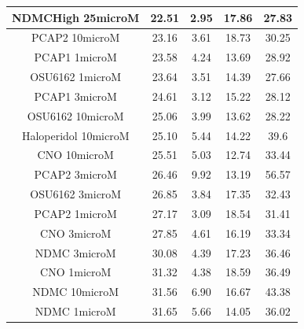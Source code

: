 \documentclass[a4paper,12pt]{article}
\begin{document}
\begin{table}[h!]
\begin{tabular}{|c|c|c|c|c|}
NDMCHigh 25microM     & 22.51 & 2.95 & 17.86 & 27.83 \\ \hline
PCAP2 10microM        & 23.16 & 3.61 & 18.73 & 30.25 \\ \hline
PCAP1 1microM         & 23.58 & 4.24 & 13.69 & 28.92 \\ \hline
OSU6162 1microM       & 23.64 & 3.51 & 14.39 & 27.66 \\ \hline
PCAP1 3microM         & 24.61 & 3.12 & 15.22 & 28.12 \\ \hline
OSU6162 10microM      & 25.06 & 3.99 & 13.62 & 28.22 \\ \hline
Haloperidol 10microM  & 25.10  & 5.44 & 14.22 & 39.6  \\ \hline
CNO 10microM          & 25.51 & 5.03 & 12.74 & 33.44 \\ \hline
PCAP2 3microM         & 26.46 & 9.92 & 13.19 & 56.57 \\ \hline
OSU6162 3microM       & 26.85 & 3.84 & 17.35 & 32.43 \\ \hline
PCAP2 1microM         & 27.17 & 3.09 & 18.54 & 31.41 \\ \hline
CNO 3microM           & 27.85 & 4.61 & 16.19 & 33.34 \\ \hline
NDMC 3microM          & 30.08 & 4.39 & 17.23 & 36.46 \\ \hline
CNO 1microM           & 31.32 & 4.38 & 18.59 & 36.49 \\ \hline
NDMC 10microM         & 31.56 & 6.90  & 16.67 & 43.38 \\ \hline
NDMC 1microM          & 31.65 & 5.66 & 14.05 & 36.02 \\ \hline
\end{tabular}
\end{table}
\end{document}
